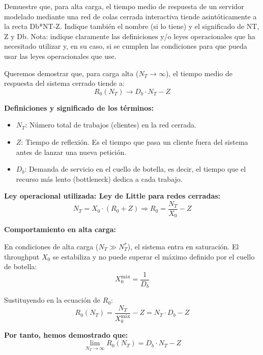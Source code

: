 \documentclass[a4paper,12pt]{article}
\begin{document}
    \begin{tcolorbox}[colback=gray!10, colframe=black, title=5.- (1 punto)]
    Demuestre que, para alta carga, el tiempo medio de respuesta de un servidor modelado mediante una red de colas cerrada interactiva tiende asintóticamente a la recta Db*NT-Z. Indique también el nombre (si lo tiene) y el significado de NT, Z y Db. Nota: indique claramente las definiciones y/o leyes operacionales que ha necesitado utilizar y, en su caso, si se cumplen las condiciones para que pueda usar las leyes operacionales que use.
    \end{tcolorbox}


        Queremos demostrar que, para carga alta ($N_T \to \infty$), el tiempo medio de respuesta del sistema cerrado tiende a:
        $$
        R_0(N_T) \to D_b \cdot N_T - Z
        $$
        
        \textbf{Definiciones y significado de los términos:}
        \begin{itemize}
            \item $N_T$: Número total de trabajos (clientes) en la red cerrada.
            \item $Z$: Tiempo de reflexión. Es el tiempo que pasa un cliente fuera del sistema antes de lanzar una nueva petición.
            \item $D_b$: Demanda de servicio en el cuello de botella, es decir, el tiempo que el recurso más lento (bottleneck) dedica a cada trabajo.
        \end{itemize}
        
        \textbf{Ley operacional utilizada: Ley de Little para redes cerradas:}
        \[
        N_T = X_0 \cdot (R_0 + Z)
        \Rightarrow R_0 = \frac{N_T}{X_0} - Z
        \]
        
        \textbf{Comportamiento en alta carga:}
        
        En condiciones de alta carga ($N_T \gg N_T^*$), el sistema entra en saturación. El throughput $X_0$ se estabiliza y no puede superar el máximo definido por el cuello de botella:
        \[
        X_0^{\text{máx}} = \frac{1}{D_b}
        \]
        
        Sustituyendo en la ecuación de $R_0$:
        \[
        R_0(N_T) = \frac{N_T}{X_0^{\text{máx}}} - Z = N_T \cdot D_b - Z
        \]
        
        \textbf{Por tanto, hemos demostrado que:}
        \[
        \lim_{N_T \to \infty} R_0(N_T) = D_b \cdot N_T - Z
        \]
        
\end{document}
